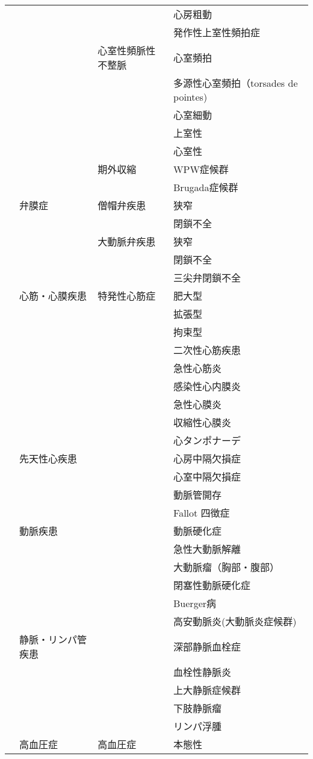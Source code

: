 \begin{xltabular}{\linewidth}{XXXX}
 &  &  & 心房粗動 \\
 &  &  & 発作性上室性頻拍症 \\
 &  & 心室性頻脈性不整脈 & 心室頻拍 \\
 &  &  & 多源性心室頻拍（torsades de pointes) \\
 &  &  & 心室細動 \\
 &  &  & 上室性 \\
 &  &  & 心室性 \\
 &  & 期外収縮 & WPW症候群 \\
 &  &  & Brugada症候群 \\
 & 弁膜症 & 僧帽弁疾患 & 狭窄 \\
 &  &  & 閉鎖不全 \\
 &  & 大動脈弁疾患 & 狭窄 \\
 &  &  & 閉鎖不全 \\
 &  &  & 三尖弁閉鎖不全 \\
 & 心筋・心膜疾患 & 特発性心筋症 & 肥大型 \\
 &  &  & 拡張型 \\
 &  &  & 拘束型 \\
 &  &  & 二次性心筋疾患 \\
 &  &  & 急性心筋炎 \\
 &  &  & 感染性心内膜炎 \\
 &  &  & 急性心膜炎 \\
 &  &  & 収縮性心膜炎 \\
 &  &  & 心タンポナーデ \\
 & 先天性心疾患 &  & 心房中隔欠損症 \\
 &  &  & 心室中隔欠損症 \\
 &  &  & 動脈管開存 \\
 &  &  & Fallot 四徴症 \\
 & 動脈疾患 &  & 動脈硬化症 \\
 &  &  & 急性大動脈解離 \\
 &  &  & 大動脈瘤（胸部・腹部） \\
 &  &  & 閉塞性動脈硬化症 \\
 &  &  & Buerger病 \\
 &  &  & 高安動脈炎(大動脈炎症候群) \\
 & 静脈・リンパ管疾患 &  & 深部静脈血栓症 \\
 &  &  & 血栓性静脈炎 \\
 &  &  & 上大静脈症候群 \\
 &  &  & 下肢静脈瘤 \\
 &  &  & リンパ浮腫 \\
 & 高血圧症 & 高血圧症 & 本態性 \\

\end{xltabular}
